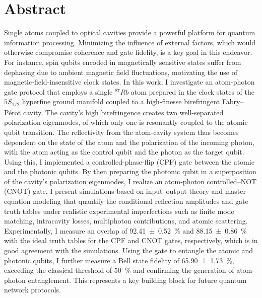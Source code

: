 \chapter*{\centering Abstract}

Single atoms coupled to optical cavities provide a powerful platform for quantum information processing. Minimizing the influence of external factors, which would otherwise compromise coherence and gate fidelity, is a key goal in this endeavor. For instance, spin qubits encoded in magnetically sensitive states suffer from dephasing due to ambient magnetic field fluctuations, motivating the use of magnetic-field-insensitive clock states. In this work, I investigate an atom-photon gate protocol that employs a single $^{87}Rb$ atom prepared in the clock states of the $5S_{1/2}$ hyperfine ground manifold coupled to a high-finesse birefringent Fabry–Pérot cavity. The cavity’s high birefringence creates two well-separated polarization eigenmodes, of which only one is resonantly coupled to the atomic qubit transition. The reflectivity from the atom-cavity system thus becomes dependent on the state of the atom and the polarization of the incoming photon, with the atom acting as the control qubit and the photon as the target qubit. Using this, I implemented a controlled-phase-flip (CPF) gate between the atomic and the photonic qubits. By then preparing the photonic qubit in a superposition of the cavity's polarization eigenmodes, I realize an atom-photon controlled--NOT (CNOT) gate. I present simulations based on input–output theory and master-equation modeling that quantify the conditional reflection amplitudes and gate truth tables under realistic experimental imperfections such as finite mode matching, intracavity losses, multiphoton contributions, and atomic scattering.
Experimentally, I measure an overlap of \SI{92.41\pm0.52}{\percent} and \SI{88.15\pm0.86}{\percent} with the ideal truth tables for the CPF and CNOT gates, respectively, which is in good agreement with the simulations. Using the gate to entangle the atomic and photonic qubits, I further measure a Bell state fidelity of \SI{65.90\pm1.73}{\percent}, exceeding the classical threshold of \SI{50}{\percent} and confirming the generation of atom-photon entanglement. This represents a key building block for future quantum network protocols.
